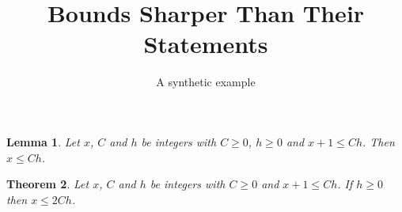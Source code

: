 \documentclass[11pt]{article}
\title{Bounds Sharper Than Their Statements}
\author{A synthetic example}
\date{}
\newtheorem{theorem}{Theorem}
\newtheorem{lemma}[theorem]{Lemma}
\newcommand{\lean}[1]{}
\begin{document}
\maketitle

\begin{lemma}\label{lem:sharp}\lean{Facts.bound}
Let $x$, $C$ and $h$ be integers with $C \ge 0$, $h \ge 0$ and $x + 1 \le C h$. Then
$x \le C h$.
\end{lemma}

\begin{theorem}\label{thm:cases}\lean{Facts.bound_cases}
Let $x$, $C$ and $h$ be integers with $C \ge 0$ and $x + 1 \le C h$. If $h \ge 0$ then
$x \le 2 C h$.
\end{theorem}
\end{document}
